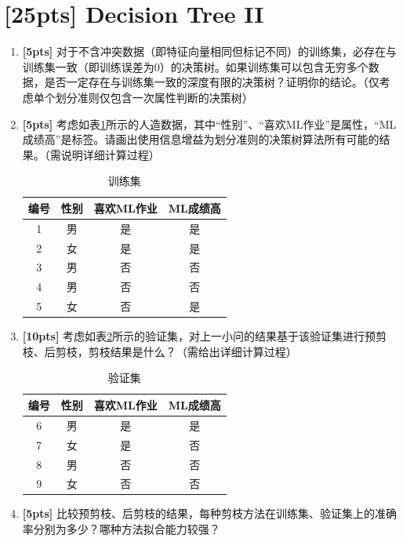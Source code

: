 \documentclass[a4paper,UTF8]{article}
\theoremstyle{definition}
\begin{document}
\section{[25pts] Decision Tree II}

\begin{enumerate}[(1)]
	\item \textbf{[5pts]} 对于不含冲突数据（即特征向量相同但标记不同）的训练集，必存在与训练集一致（即训练误差为$0$）的决策树。如果训练集可以包含无穷多个数据，是否一定存在与训练集一致的深度有限的决策树？证明你的结论。（仅考虑单个划分准则仅包含一次属性判断的决策树）
	\item \textbf{[5pts]} 考虑如表\ref{train data for tree}所示的人造数据，其中“性别”、“喜欢ML作业”是属性，“ML成绩高”是标签。请画出使用信息增益为划分准则的决策树算法所有可能的结果。（需说明详细计算过程）
	\begin{table}[h]
		\caption{训练集}
		\label{train data for tree}
		\centering
		\begin{tabular}{cccc}
			\hline 
			编号 & 性别 & 喜欢ML作业 & ML成绩高 \\ 
			\hline 
			1 & 男 & 是 & 是 \\ 
			2 & 女 & 是 & 是 \\ 
			3 & 男 & 否 & 否 \\ 
			4 & 男 & 否 & 否 \\ 
			5 & 女 & 否 & 是 \\ 
			\hline 
		\end{tabular}
	\end{table}
	\item \textbf{[10pts]} 考虑如表\ref{validation data for tree}所示的验证集，对上一小问的结果基于该验证集进行预剪枝、后剪枝，剪枝结果是什么？（需给出详细计算过程）
	\begin{table}[h]
		\caption{验证集}
		\label{validation data for tree}
		\centering
		\begin{tabular}{cccc}
			\hline 
			编号 & 性别 & 喜欢ML作业 & ML成绩高 \\ 
			\hline 
			6 & 男 & 是 & 是 \\ 
			7 & 女 & 是 & 否 \\ 
			8 & 男 & 否 & 否 \\ 
			9 & 女 & 否 & 否 \\ 
			\hline 
		\end{tabular}
	\end{table}
	\item \textbf{[5pts]} 比较预剪枝、后剪枝的结果，每种剪枝方法在训练集、验证集上的准确率分别为多少？哪种方法拟合能力较强？
\end{enumerate}
\end{document}
